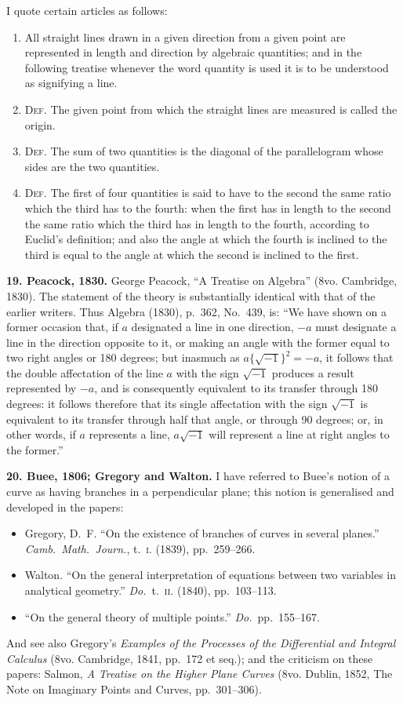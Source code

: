 \documentclass[11pt,a4paper]{article}
\theoremstyle{definition}
\begin{document}
I quote certain articles as follows:
\begin{enumerate}[label=(\arabic*)]
\item All straight lines drawn in a given direction from a given point are represented in length and direction by algebraic quantities; and in the following treatise whenever the word quantity is used it is to be understood as signifying a line.
\item \textsc{Def.} The given point from which the straight lines are measured is called the origin.
\item \textsc{Def.} The sum of two quantities is the diagonal of the parallelogram whose sides are the two quantities.
\setcounter{enumi}{11}
\item \textsc{Def.} The first of four quantities is said to have to the second the same ratio which the third has to the fourth: when the first has in length to the second the same ratio which the third has in length to the fourth, according to Euclid's definition; and also the angle at which the fourth is inclined to the third is equal to the angle at which the second is inclined to the first.
\end{enumerate}

\textbf{19. Peacock, 1830.} George Peacock, ``A Treatise on Algebra'' (8vo. Cambridge, 1830). The statement of the theory is substantially identical with that of the earlier writers. Thus Algebra (1830), p.~362, No.~439, is: ``We have shown on a former occasion that, if $a$ designated a line in one direction, $-a$ must designate a line in the direction opposite to it, or making an angle with the former equal to two right angles or 180 degrees; but inasmuch as $a\{\sqrt{-1}\}^2 = -a$, it follows that the double affectation of the line $a$ with the sign $\sqrt{-1}$ produces a result represented by $-a$, and is consequently equivalent to its transfer through 180 degrees: it follows therefore that its single affectation with the sign $\sqrt{-1}$ is equivalent to its transfer through half that angle, or through 90 degrees; or, in other words, if $a$ represents a line, $a\sqrt{-1}$ will represent a line at right angles to the former.''

\textbf{20. Buee, 1806; Gregory and Walton.} I have referred to Buee's notion of a curve as having branches in a perpendicular plane; this notion is generalised and developed in the papers:
\begin{itemize}
\item Gregory, D.~F. ``On the existence of branches of curves in several planes.'' \textit{Camb.\ Math.\ Journ.}, t.~\textsc{i}. (1839), pp.~259--266.
\item Walton. ``On the general interpretation of equations between two variables in analytical geometry.'' \textit{Do.}\ t.~\textsc{ii}. (1840), pp.~103--113.
\item ``On the general theory of multiple points.'' \textit{Do.}\ pp.~155--167.
\end{itemize}
And see also Gregory's \textit{Examples of the Processes of the Differential and Integral Calculus} (8vo. Cambridge, 1841, pp.~172 et seq.); and the criticism on these papers: Salmon, \textit{A Treatise on the Higher Plane Curves} (8vo. Dublin, 1852, The Note on Imaginary Points and Curves, pp.~301--306).
\end{document}
